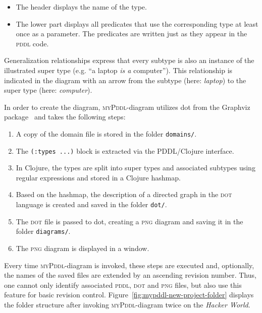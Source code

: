 \documentclass[runningheads]{llncs}
\newcommand{\mypddl}{\textsc{myPddl}\xspace}
\newcommand{\pddl}{\textsc{pddl}\xspace}
\begin{document}
\begin{description}
  \begin{itemize}
  \item The header displays the name of the type.
  \item The lower part displays all predicates that use the
    corresponding type at least once as a parameter. The predicates
    are written just as they appear in the \pddl code.
\end{itemize}

Generalization relationships express that every subtype is also an
instance of the illustrated super type (e.g. ``a laptop \emph{is a}
computer''). This relationship is indicated in the diagram with an
arrow from the subtype (here: \emph{laptop}) to the super type (here:
\emph{computer}).


In order to create the diagram, \mypddl-diagram utilizes dot from the
Graphviz package~\cite{ellson2002graphviz} and takes the following
steps:

\begin{enumerate}
\item A copy of the domain file is stored in the folder
  \texttt{domains/}.
\item The \texttt{(:types~...)} block is extracted via the PDDL/Clojure
  interface.
\item In Clojure, the types are split into super types and associated
  subtypes using regular expressions and stored in a Clojure hashmap.
\item Based on the hashmap, the description of a directed graph in the
  \textsc{dot} language is created and saved in the folder
  \texttt{dot/}.
\item The \textsc{dot} file is passed to dot, creating a \textsc{png}
  diagram and saving it in the folder
  \texttt{diagrams/}.
\item The \textsc{png} diagram is displayed in a window.
\end{enumerate}

Every time \mypddl-diagram is invoked, these steps are executed and,
optionally, the names of the saved files are extended by an ascending
revision number. Thus, one cannot only identify associated \pddl,
\textsc{dot} and \textsc{png} files, but also use this feature for
basic revision control. Figure~\ref{fig:mypddl-new-project-folder}
displays the folder structure after invoking \mypddl-diagram twice on
the \emph{Hacker World}.


\end{description}
\end{document}
